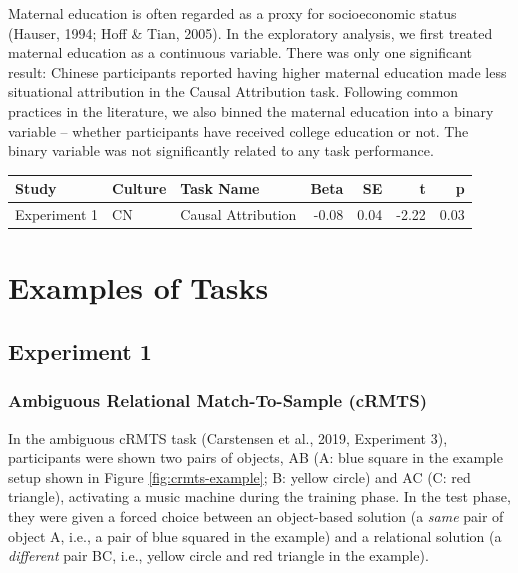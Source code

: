 \documentclass[
  man,floatsintext]{apa6}
\begin{document}
Maternal education is often regarded as a proxy for socioeconomic status (Hauser, 1994; Hoff \& Tian, 2005). In the exploratory analysis, we first treated maternal education as a continuous variable. There was only one significant result: Chinese participants reported having higher maternal education made less situational attribution in the Causal Attribution task. Following common practices in the literature, we also binned the maternal education into a binary variable -- whether participants have received college education or not. The binary variable was not significantly related to any task performance.

\begin{table}[H]
\centering\begingroup\fontsize{9.5}{11.5}\selectfont

\begin{tabular}{l|l|l|r|r|r|r}
\hline
Study & Culture & Task Name & Beta & SE & t & p\\
\hline
Experiment 1 & CN & Causal Attribution & -0.08 & 0.04 & -2.22 & 0.03\\
\hline
\end{tabular}
\endgroup{}
\end{table}

\hypertarget{examples-of-tasks}{%
\section{Examples of Tasks}\label{examples-of-tasks}}

\hypertarget{experiment-1-2}{%
\subsection{Experiment 1}\label{experiment-1-2}}

\hypertarget{ambiguous-relational-match-to-sample-crmts}{%
\subsubsection{Ambiguous Relational Match-To-Sample (cRMTS)}\label{ambiguous-relational-match-to-sample-crmts}}

In the ambiguous cRMTS task (Carstensen et al., 2019, Experiment 3), participants were shown two pairs of objects, AB (A: blue square in the example setup shown in Figure \ref{fig:crmts-example}; B: yellow circle) and AC (C: red triangle), activating a music machine during the training phase. In the test phase, they were given a forced choice between an object-based solution (a \emph{same} pair of object A, i.e., a pair of blue squared in the example) and a relational solution (a \emph{different} pair BC, i.e., yellow circle and red triangle in the example).
\end{document}
